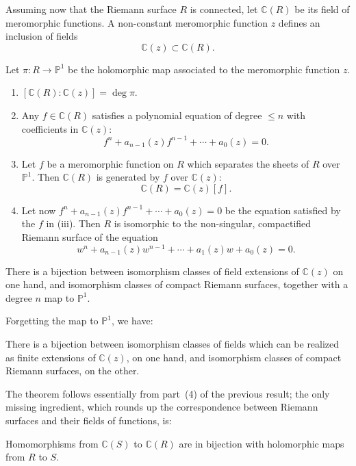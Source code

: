 \documentclass[12pt]{article}
\begin{document}
Assuming now that the Riemann surface $R$ is connected, let $\mathbb{C}(R)$ be its field of meromorphic functions.  
A non-constant meromorphic function $z$ defines an inclusion of fields
\[
\mathbb{C}(z) \subset \mathbb{C}(R).
\]
\begin{theorem}
    Let $\pi : R \to \mathbb{P}^1$ be the holomorphic map associated to the meromorphic function $z$.
\begin{enumerate}
    \item $[\mathbb{C}(R):\mathbb{C}(z)] = \deg \pi$.
    \item Any $f \in \mathbb{C}(R)$ satisfies a polynomial equation of degree $\le n$ with coefficients in $\mathbb{C}(z)$:
    \[
    f^n + a_{n-1}(z)f^{n-1} + \cdots + a_0(z) = 0.
    \]
    \item Let $f$ be a meromorphic function on $R$ which separates the sheets of $R$ over $\mathbb{P}^1$.  
    Then $\mathbb{C}(R)$ is generated by $f$ over $\mathbb{C}(z)$:
    \[
    \mathbb{C}(R) = \mathbb{C}(z)[f].
    \]
    \item Let now $f^n + a_{n-1}(z)f^{n-1} + \cdots + a_0(z) = 0$ be the equation satisfied by the $f$ in (iii).  
    Then $R$ is isomorphic to the non-singular, compactified Riemann surface of the equation
    \[
    w^n + a_{n-1}(z)w^{n-1} + \cdots + a_1(z)w + a_0(z) = 0.
    \]
\end{enumerate}
\end{theorem}

\begin{theorem}
There is a bijection between isomorphism classes of field extensions of $\mathbb{C}(z)$ on one hand, and isomorphism classes of compact Riemann surfaces, together with a degree $n$ map to $\mathbb{P}^1$.
\end{theorem}

Forgetting the map to $\mathbb{P}^1$, we have:

\begin{theorem}
There is a bijection between isomorphism classes of fields which can be realized as finite extensions of $\mathbb{C}(z)$, on one hand, and isomorphism classes of compact Riemann surfaces, on the other.
\end{theorem}

The theorem follows essentially from part~(4) of the previous result; the only missing ingredient, which rounds up the correspondence between Riemann surfaces and their fields of functions, is:

\begin{theorem}
Homomorphisms from $\mathbb{C}(S)$ to $\mathbb{C}(R)$ are in bijection with holomorphic maps from $R$ to $S$.
\end{theorem}
\end{document}
